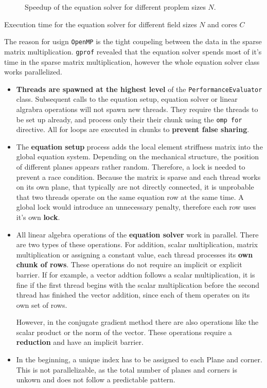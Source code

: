 \documentclass[12pt]{article}
\begin{document}
\begin{figure}[p]
    \centering
    
    \caption{Speedup of the equation solver for different proplem sizes $N$.}
    \label{fig:SpeedupSimulation}
\end{figure}

\begin{table}[p]
    \centering
    
    \caption{Execution time for the equation solver for different field sizes $N$ and cores $C$}
    \label{tab:SpeedupSimulation}
\end{table}

The reason for usign \texttt{OpenMP} is the tight coupeling between the data in the sparse matrix multiplication. \texttt{gprof} revealed that the equation solver spends most of it's time in the sparse matrix multiplication, however the whole equation solver class works parallelized.

\begin{itemize}
    \item \textbf{Threads are spawned at the highest level} of the \texttt{PerformanceEvaluator} class. Subsequent calls to the equation setup, equation solver or linear algrabra operations will not spawn new threads. They require the threads to be set up already, and process only their their chunk using the \texttt{omp for} directive. All for loops are executed in chunks to \textbf{prevent false sharing}.
    \item The \textbf{equation setup} process adds the local element striffness matrix into the global equation system. Depending on the mechanical structure, the position of different planes appears rather random. Therefore, a lock is needed to prevent a race condition. Because the matrix is sparse and each thread works on its own plane, that typically are not directly connected, it is unprobable that two threads operate on the same equation row at the same time. A global lock would introduce an unnecessary penalty, therefore each row uses it's own \textbf{lock}.
    \item All linear algebra operations of the \textbf{equation solver} work in parallel. There are two types of these operations. For addition, scalar multiplication, matrix multiplication or assigning a constant value, each thread processes its \textbf{own chunk of rows}. These operations do not require an implicit or explicit barrier. If for example, a vector addtion follows a scalar multiplication, it is fine if the first thread begins with the scalar multiplication before the second thread has finished the vector addition, since each of them operates on its own set of rows.
    
    However, in the conjugate gradient method there are also operations like the scalar product or the norm of the vector. These operations require a \textbf{reduction} and have an implicit barrier.
    \item In the beginning, a unique index has to be assigned to each Plane and corner. This is not parallelizable, as the total number of planes and corners is unkown and does not follow a predictable pattern.
\end{itemize}
\end{document}
